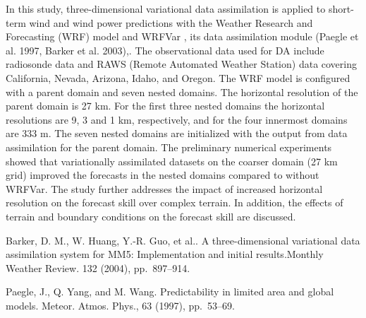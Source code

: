 In this study, three-dimensional variational data assimilation is applied to short-term wind and wind power predictions with the Weather Research and Forecasting (WRF) model and WRFVar , its data assimilation module (Paegle et al. 1997, Barker et al. 2003),. The observational data used for DA include radiosonde data and RAWS (Remote Automated Weather Station) data covering California, Nevada, Arizona, Idaho, and Oregon. The WRF model is configured with a parent domain and seven nested domains. The horizontal resolution of the parent domain is 27 km. For the first three nested domains the horizontal resolutions are 9, 3 and 1 km, respectively, and for the four innermost domains are 333 m. The seven nested domains are initialized with the output from data assimilation for the parent domain. The preliminary numerical experiments showed that variationally assimilated datasets on the coarser domain (27 km grid) improved the forecasts in the nested domains compared to without WRFVar. The study further addresses the impact of increased horizontal resolution on the forecast skill over complex terrain. In addition, the effects of terrain and boundary conditions on the forecast skill are discussed.


\begin{thebibliography}{10}
{\sc Barker, D. M., W. Huang, Y.-R. Guo, et al.}. {A three-dimensional variational data assimilation system for MM5: Implementation and initial results}.Monthly Weather Review. 132 (2004), pp.~897--914.

{\sc Paegle, J., Q. Yang, and M. Wang}. {Predictability in limited area and global models}. Meteor. Atmos. Phys., 63 (1997), pp.~53--69.
\end{thebibliography}